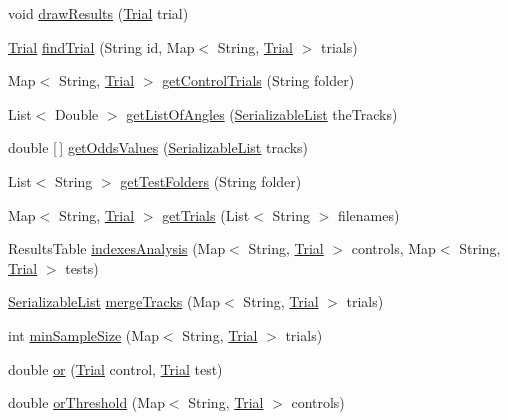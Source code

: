\begin{DoxyCompactItemize}
\item 
void \hyperlink{classanalysis_1_1_chemotaxis_ab864eab3ca8e5147e34d6a4747d24e72}{draw\+Results} (\hyperlink{classdata_1_1_trial}{Trial} trial)
\item 
\hyperlink{classdata_1_1_trial}{Trial} \hyperlink{classanalysis_1_1_chemotaxis_a40fa55bdb0e1b4e7e0f9de92076ab2f9}{find\+Trial} (String id, Map$<$ String, \hyperlink{classdata_1_1_trial}{Trial} $>$ trials)
\item 
Map$<$ String, \hyperlink{classdata_1_1_trial}{Trial} $>$ \hyperlink{classanalysis_1_1_chemotaxis_a00ea60f92f2e11a363c01d04b6df7f10}{get\+Control\+Trials} (String folder)
\item 
List$<$ Double $>$ \hyperlink{classanalysis_1_1_chemotaxis_a0a5886ad5b1d3a1dee18ed4fe5da7ed8}{get\+List\+Of\+Angles} (\hyperlink{classdata_1_1_serializable_list}{Serializable\+List} the\+Tracks)
\item 
double \mbox{[}$\,$\mbox{]} \hyperlink{classanalysis_1_1_chemotaxis_a02c2fbfd2097bca3933e285e6712a58d}{get\+Odds\+Values} (\hyperlink{classdata_1_1_serializable_list}{Serializable\+List} tracks)
\item 
List$<$ String $>$ \hyperlink{classanalysis_1_1_chemotaxis_a973011dfbed998ea23443c2b79ac9ee3}{get\+Test\+Folders} (String folder)
\item 
Map$<$ String, \hyperlink{classdata_1_1_trial}{Trial} $>$ \hyperlink{classanalysis_1_1_chemotaxis_a5580224f7f7e9df7d925ad14f9364d98}{get\+Trials} (List$<$ String $>$ filenames)
\item 
Results\+Table \hyperlink{classanalysis_1_1_chemotaxis_ae0431b7311aa1bb593e062536734de2c}{indexes\+Analysis} (Map$<$ String, \hyperlink{classdata_1_1_trial}{Trial} $>$ controls, Map$<$ String, \hyperlink{classdata_1_1_trial}{Trial} $>$ tests)
\item 
\hyperlink{classdata_1_1_serializable_list}{Serializable\+List} \hyperlink{classanalysis_1_1_chemotaxis_a226e01e0b4acab847ec3b2c1bb233740}{merge\+Tracks} (Map$<$ String, \hyperlink{classdata_1_1_trial}{Trial} $>$ trials)
\item 
int \hyperlink{classanalysis_1_1_chemotaxis_a3ae63569c841ffc6aa09be276f526c03}{min\+Sample\+Size} (Map$<$ String, \hyperlink{classdata_1_1_trial}{Trial} $>$ trials)
\item 
double \hyperlink{classanalysis_1_1_chemotaxis_a4cf45f4c73ebe44a71a622c690f0b331}{or} (\hyperlink{classdata_1_1_trial}{Trial} control, \hyperlink{classdata_1_1_trial}{Trial} test)
\item 
double \hyperlink{classanalysis_1_1_chemotaxis_a8ee54f019a9258760e20482e3cd6b851}{or\+Threshold} (Map$<$ String, \hyperlink{classdata_1_1_trial}{Trial} $>$ controls)

\end{DoxyCompactItemize}
